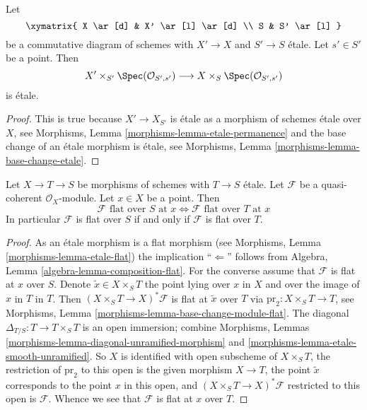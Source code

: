 \begin{lemma}
\label{lemma-etale-at-point}
Let
$$
\xymatrix{
X \ar[d] & X' \ar[l] \ar[d] \\
S & S' \ar[l]
}
$$
be a commutative diagram of schemes with $X' \to X$ and $S' \to S$ \'etale.
Let $s' \in S'$ be a point. Then
$$
X' \times_{S'} \Spec(\mathcal{O}_{S', s'})
\longrightarrow
X \times_S \Spec(\mathcal{O}_{S', s'})
$$
is \'etale.
\end{lemma}

\begin{proof}
This is true because $X' \to X_{S'}$ is \'etale as a morphism of
schemes \'etale over $X$, see
Morphisms, Lemma \ref{morphisms-lemma-etale-permanence}
and the base change of an \'etale morphism is \'etale, see
Morphisms, Lemma \ref{morphisms-lemma-base-change-etale}.
\end{proof}

\begin{lemma}
\label{lemma-etale-flat-up-down}
Let $X \to T \to S$ be morphisms of schemes with $T \to S$ \'etale.
Let $\mathcal{F}$ be a quasi-coherent $\mathcal{O}_X$-module.
Let $x \in X$ be a point. Then
$$
\mathcal{F}\text{ flat over }S\text{ at }x
\Leftrightarrow
\mathcal{F}\text{ flat over }T\text{ at }x
$$
In particular $\mathcal{F}$ is flat over $S$ if and only if $\mathcal{F}$
is flat over $T$.
\end{lemma}

\begin{proof}
As an \'etale morphism is a flat morphism (see
Morphisms, Lemma \ref{morphisms-lemma-etale-flat})
the implication ``$\Leftarrow$'' follows from
Algebra, Lemma \ref{algebra-lemma-composition-flat}.
For the converse assume that $\mathcal{F}$ is flat at $x$ over $S$.
Denote $\tilde x \in X \times_S T$ the point lying over $x$ in $X$
and over the image of $x$ in $T$ in $T$.
Then $(X \times_S T \to X)^*\mathcal{F}$ is flat at $\tilde x$ over $T$
via $\text{pr}_2 : X \times_S T \to T$, see
Morphisms, Lemma \ref{morphisms-lemma-base-change-module-flat}.
The diagonal $\Delta_{T/S} : T \to T \times_S T$ is an open immersion;
combine
Morphisms, Lemmas \ref{morphisms-lemma-diagonal-unramified-morphism} and
\ref{morphisms-lemma-etale-smooth-unramified}.
So $X$ is identified with open subscheme of $X \times_S T$,
the restriction of $\text{pr}_2$ to this open is the given morphism $X \to T$,
the point $\tilde x$ corresponds to the point $x$ in this open, and
$(X \times_S T \to X)^*\mathcal{F}$ restricted to this open is $\mathcal{F}$.
Whence we see that $\mathcal{F}$ is flat at $x$ over $T$.
\end{proof}

